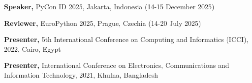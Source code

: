 
\begin{cvlistsection}
\item \textbf{Speaker,} PyCon ID 2025, Jakarta, Indonesia (14-15 December 2025)
\item \textbf{Reviewer,} EuroPython 2025, Prague, Czechia (14-20 July 2025)
\item \textbf{Presenter,} 5th International Conference on Computing and Informatics (ICCI), 2022, Cairo, Egypt
\item \textbf{Presenter,} International Conference on Electronics, Communications and Information Technology, 2021, Khulna, Bangladesh




\end{cvlistsection}
